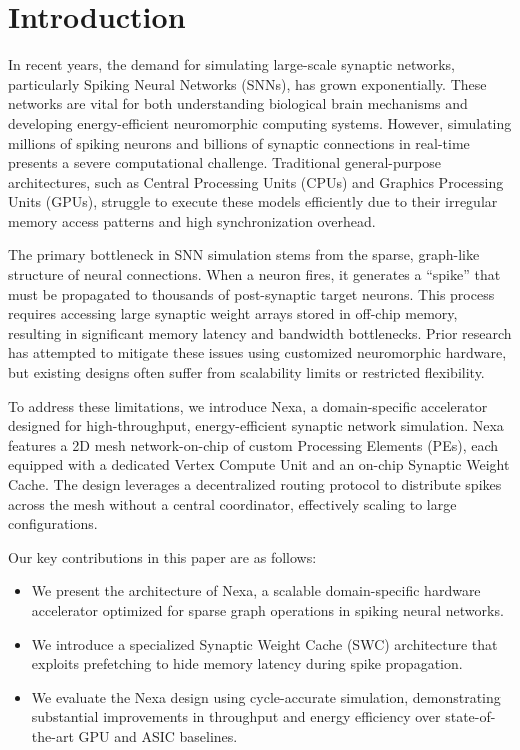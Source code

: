 \section{Introduction}
In recent years, the demand for simulating large-scale synaptic networks, particularly Spiking Neural Networks (SNNs), has grown exponentially. These networks are vital for both understanding biological brain mechanisms and developing energy-efficient neuromorphic computing systems. However, simulating millions of spiking neurons and billions of synaptic connections in real-time presents a severe computational challenge. Traditional general-purpose architectures, such as Central Processing Units (CPUs) and Graphics Processing Units (GPUs), struggle to execute these models efficiently due to their irregular memory access patterns and high synchronization overhead.

The primary bottleneck in SNN simulation stems from the sparse, graph-like structure of neural connections. When a neuron fires, it generates a ``spike'' that must be propagated to thousands of post-synaptic target neurons. This process requires accessing large synaptic weight arrays stored in off-chip memory, resulting in significant memory latency and bandwidth bottlenecks. Prior research has attempted to mitigate these issues using customized neuromorphic hardware, but existing designs often suffer from scalability limits or restricted flexibility.

To address these limitations, we introduce Nexa, a domain-specific accelerator designed for high-throughput, energy-efficient synaptic network simulation. Nexa features a 2D mesh network-on-chip of custom Processing Elements (PEs), each equipped with a dedicated Vertex Compute Unit and an on-chip Synaptic Weight Cache. The design leverages a decentralized routing protocol to distribute spikes across the mesh without a central coordinator, effectively scaling to large configurations.

Our key contributions in this paper are as follows:
\begin{itemize}
  \item We present the architecture of Nexa, a scalable domain-specific hardware accelerator optimized for sparse graph operations in spiking neural networks.
  \item We introduce a specialized Synaptic Weight Cache (SWC) architecture that exploits prefetching to hide memory latency during spike propagation.
  \item We evaluate the Nexa design using cycle-accurate simulation, demonstrating substantial improvements in throughput and energy efficiency over state-of-the-art GPU and ASIC baselines.
\end{itemize}
